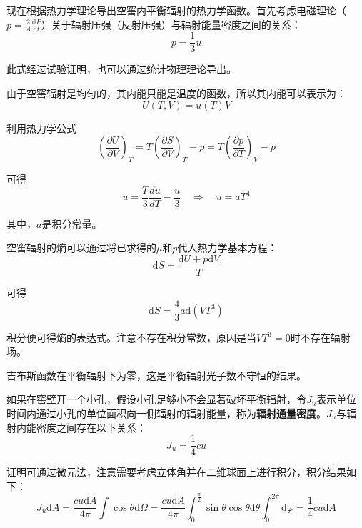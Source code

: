 \documentclass[UTF8]{ctexart}
\newcommand{\dif}{\mathrm{d}}
\begin{document}
	现在根据热力学理论导出空窖内平衡辐射的热力学函数。首先考虑电磁理论（$ p = \frac{2}{A} \frac{\dif P}{\dif t} $）关于辐射压强（反射压强）与辐射能量密度之间的关系：
	\begin{equation}
		p = \frac{1}{3} u
	\end{equation}
	
\noindent 此式经过试验证明，也可以通过统计物理理论导出。

	由于空窖辐射是均匀的，其内能只能是温度的函数，所以其内能可以表示为：
	\begin{equation}
		U(T,V)=u(T) V
	\end{equation}
	
\noindent 利用热力学公式
\begin{equation}
	\left(\frac{\partial U}{\partial V}\right)_{T}=T\left(\frac{\partial S}{\partial V}\right)_{T}-p=T\left(\frac{\partial p}{\partial T}\right)_{V}-p
\end{equation}

\noindent 可得
\begin{equation}
	u=\frac{T}{3} \frac{d u}{d T}-\frac{u}{3} \quad \Longrightarrow \quad u=a T^{4}
\end{equation}

\noindent 其中，$ a $是积分常量。

	空窖辐射的熵可以通过将已求得的$ \mu $和$ p $代入热力学基本方程：
	\begin{equation}
	\mathrm{d} S=\frac{\mathrm{d} U+p \mathrm{d} V}{T}
	\end{equation}
	
\noindent 可得
\begin{equation}
	\dif S = \frac{4}{3} a \dif (V T^{3})
\end{equation}

\noindent 积分便可得熵的表达式。注意不存在积分常数，原因是当$ V T^{3} = 0 $时不存在辐射场。

	吉布斯函数在平衡辐射下为零，这是平衡辐射光子数不守恒的结果。
	
	如果在窖壁开一个小孔，假设小孔足够小不会显著破坏平衡辐射，令$ J_{u} $表示单位时间内通过小孔的单位面积向一侧辐射的辐射能量，称为\textbf{辐射通量密度}。$ J_{u} $与辐射内能密度之间存在以下关系：
	\begin{equation}
		J_{u} = \frac{1}{4} c u
	\end{equation}
	
\noindent 证明可通过微元法，注意需要考虑立体角并在二维球面上进行积分，积分结果如下：
\begin{equation}
J_{u} \mathrm{d} A=\frac{c u \mathrm{d} A}{4 \pi} \int \cos \theta \mathrm{d} \Omega=\frac{c u \mathrm{d} A}{4 \pi} \int_{0}^{\frac{\pi}{2}} \sin \theta \cos \theta \mathrm{d} \theta \int_{0}^{2 \pi} \mathrm{d} \varphi=\frac{1}{4} c u \dif A
\end{equation}
\end{document}
